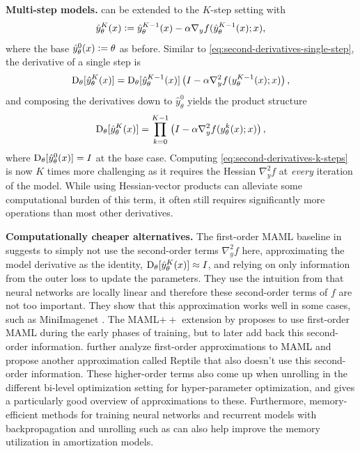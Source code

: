 \textbf{Multi-step models.}
 can be extended to the $K$-step setting with
\begin{equation}
\hat y_\theta^K(x)\vcentcolon= \hat y^{K-1}_\theta(x) - \alpha\nabla_y f(\hat y^{K-1}_\theta(x); x),
\end{equation}
where the base $\hat y_\theta^0(x)\vcentcolon=\theta$ as before.
Similar to \cref{eq:second-derivatives-single-step},
the derivative of a single step is
\begin{equation}
  \mathrm{D}_\theta[\hat y_\theta^K(x)] = \mathrm{D}_\theta[\hat y_\theta^{K-1}(x)]\left(I-\alpha\nabla_y^2 f(y_\theta^{K-1}(x); x)\right),
  \label{eq:second-derivatives-recurrent}
\end{equation}
and composing the derivatives down to $\hat y_\theta^0$ yields the product structure
\begin{equation}
  \mathrm{D}_\theta[\hat y_\theta^K(x)] = \prod_{k=0}^{K-1} \left( I-\alpha\nabla_y^2 f(y_\theta^k(x); x) \right),
  \label{eq:second-derivatives-k-steps}
\end{equation}
where $\mathrm{D}_\theta[\hat y_\theta^0(x)]=I$ at the base case.
Computing \cref{eq:second-derivatives-k-steps} is
now $K$ times more challenging as it requires the Hessian
$\nabla_y^2 f$ at \emph{every} iteration of the model.
While using Hessian-vector products can alleviate some
computational burden of this term, it often still requires
significantly more operations than most other derivatives.

\textbf{Computationally cheaper alternatives.}
The first-order MAML baseline in \citet{finn2017model} suggests to
simply not use the second-order terms $\nabla_y^2 f$ here,
approximating the model derivative as the identity,
\ie $\mathrm{D}_\theta[\hat y_\theta^K(x)]\approx I$,
and relying on only information from the outer loss
to update the parameters.
They use the intuition from \citet{goodfellow2014explaining}
that neural networks are locally linear and therefore these
second-order terms of $f$ are not too important.
They show that this approximation works well in some cases,
such as MiniImagenet \citep{ravi2016optimization}.
The MAML$++$ extension by \citet{antoniou2018train} proposes to
use first-order MAML during the early phases of training, but
to later add back this second-order information.
\citet{nichol2018first} further analyze first-order approximations
to MAML and propose another approximation called Reptile that
also doesn't use this second-order information.
These higher-order terms also come up when unrolling in the
different bi-level optimization setting for hyper-parameter optimization,
and \citet[Table 1]{lorraine2020optimizing} gives
a particularly good overview of approximations to these.
Furthermore, memory-efficient methods for training neural networks
and recurrent models with backpropagation and
unrolling such as \citet{gruslys2016memory,chen2016training}
can also help improve the memory utilization in amortization models.

